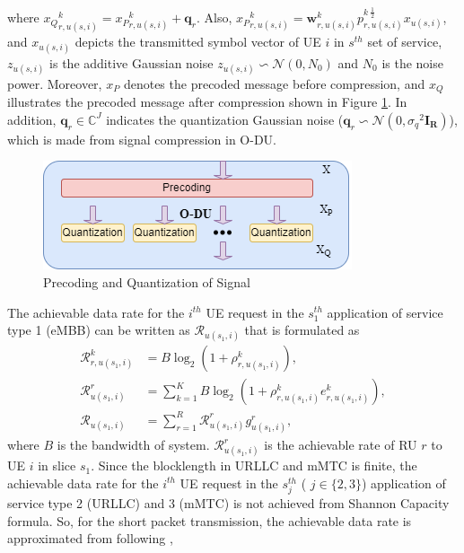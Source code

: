 \documentclass[lettersize,journal]{IEEEtran}
\begin{document}
where ${x_Q}^k_{r,u(s,i)} ={x_P}^k_{r,u(s,i)}+ \boldsymbol{q}_{r}$. Also, ${x_P}^k_{r,u(s,i)}= \boldsymbol{w}^k_{r,u(s,i)}{p^{k \: \frac{1}{2}}_{r,u(s,i)}} x_{u(s,i)} $, and  $ x_{u(s,i)}$ depicts the transmitted symbol vector of UE $i$ in $s^{th}$ set of service,  $z_{u(s,i)}$ is the additive Gaussian noise $z_{u(s,i)} \backsim \mathcal{N}(0,N_0)$ and $N_0$ is the noise power.
Moreover, ${x_P}$ denotes the precoded message before compression, and ${x_Q}$ illustrates the precoded message after compression shown in Figure \ref{fig:pq}.
In addition, $\boldsymbol{q}_{r} \in \mathbb{C}^{J }$ indicates the quantization Gaussian noise
($\boldsymbol{q}_{r} \backsim \mathcal{N}(0,{\sigma_q}^2\boldsymbol{I_{R}} )$), which is made from signal compression in O-DU.
\begin{figure}
  \centering
  \captionsetup{justification=centering}
    \includegraphics[scale = 0.45]{Qdiag.png}
  \caption{Precoding and Quantization of Signal}
  \label{fig:pq}
\end{figure}
The achievable data rate for the $i^{th}$ UE request in the $s_{1}^{th}$ application of service type 1 (eMBB) can be written as $\mathcal{R}_{u(s_1,i)}$ that is formulated as
\begin{equation}\label{eq3}
\begin{split}
\mathcal{{R}}_{r,u(s_1,i)}^{k} &=  B \log_2({1+ \rho_{r,u(s_1,i)}^{k}}) ,\\
\mathcal{R}_{u(s_1,i)}^{r} &= \sum_{k=1}^{K} B \log_2({1+ \rho_{r,u(s_1,i)}^{k}} e^k_{r,u(s_1,i)}),\\
\mathcal{R}_{u(s_1,i)} &= \sum_{r=1}^{R}\mathcal{R}_{u(s_1,i)}^{r} g^r_{u(s_1,i)},
\end{split}
\end{equation}
where $B$ is the bandwidth of system.
$\mathcal{R}_{u(s_1,i)}^{r}$ is the achievable rate of RU $r$ to UE $i$ in slice $s_1$.
Since the blocklength in URLLC and mMTC is finite, the achievable data rate for the $i^{th}$ UE request in the $s_{j}^{th}$ ( $j \in \{2,3\}$) application of service type 2 (URLLC) and 3 (mMTC) is not achieved from Shannon Capacity formula. So, for the short packet transmission, the achievable data rate is approximated from following \cite{setayesh2020joint},
\end{document}
